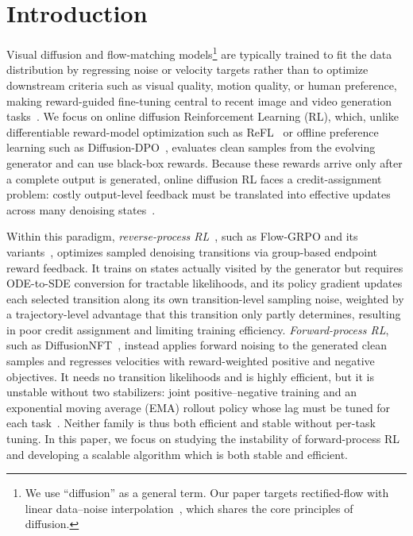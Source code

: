 \documentclass{article}
\begin{document}
\section{Introduction}
\label{sec:introduction}

Visual diffusion and flow-matching models\footnote{We use ``diffusion'' as a general term. Our paper targets rectified-flow with linear data--noise interpolation~\citep{lipman2022flowmatching}, which shares the core principles of diffusion.} are typically trained to fit the data distribution by regressing noise or velocity targets rather than to optimize downstream criteria such as visual quality, motion quality, or human preference, making reward-guided fine-tuning central to recent image and video generation tasks~\citep{xu2026qwenimage2rl,gao2025seedance}. We focus on online diffusion Reinforcement Learning (RL), which, unlike differentiable reward-model optimization such as ReFL~\citep{xu2023imagereward} or offline preference learning such as Diffusion-DPO~\citep{wallace2023diffusiondpo}, evaluates clean samples from the evolving generator and can use black-box rewards. Because these rewards arrive only after a complete output is generated, online diffusion RL faces a credit-assignment problem: costly output-level feedback must be translated into effective updates across many denoising states~\citep{liu2025flowgrpo,zheng2025diffusionnft}.

Within this paradigm, \emph{reverse-process RL}~\citep{black2023ddpo}, such as Flow-GRPO and its variants~\citep{liu2025flowgrpo,xue2025dancegrpo,he2025tempflowgrpo,wang2026grpoguard}, optimizes sampled denoising transitions via group-based endpoint reward feedback. It trains on states actually visited by the generator but requires ODE-to-SDE conversion for tractable likelihoods, and its policy gradient updates each selected transition along its own transition-level sampling noise, weighted by a trajectory-level advantage that this transition only partly determines, resulting in poor credit assignment and limiting training efficiency. \emph{Forward-process RL}, such as DiffusionNFT~\citep{zheng2025diffusionnft}, instead applies forward noising to the generated clean samples and regresses velocities with reward-weighted positive and negative objectives. It needs no transition likelihoods and is highly efficient, but it is unstable without two stabilizers: joint positive--negative training and an exponential moving average (EMA) rollout policy whose lag must be tuned for each task~\citep{zheng2025diffusionnft}. Neither family is thus both efficient and stable without per-task tuning. In this paper, we focus on studying the instability of forward-process RL and developing a scalable algorithm which is both stable and efficient.
\end{document}
